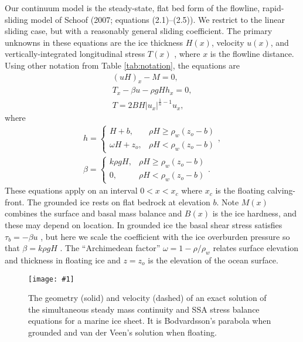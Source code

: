 \documentclass[twocolumn,letterpaper]{igs}
\newcommand{\onecol}[1]{\texttt{[image: \#1]}}
\begin{document}
Our continuum model is the steady-state, flat bed form of the flowline, rapid-sliding model of Schoof\nocite{SchoofMarine1} (2007; equations (2.1)--(2.5)).  We restrict to the linear sliding case, but with a reasonably general sliding coefficient.  The primary unknowns in these equations are the ice thickness $H(x)$, velocity $u(x)$, and vertically-integrated longitudinal stress $T(x)$ \citep{SchoofStream}, where $x$ is the flowline distance.  Using other notation from Table \ref{tab:notation}, the equations are
\begin{gather}
(uH)_x - M = 0, \label{eq:steadymass} \\
T_x - \beta u - \rho g H h_x = 0, \label{eq:steadySSA} \\
T = 2 B H |u_x|^{\frac{1}{n}-1} u_x, \label{eq:Tstress}
\end{gather}
where
\begin{gather}
h = \begin{cases} H+b,            & \rho H \ge \rho_w (z_o - b) \\
                  \omega H + z_o, & \rho H < \rho_w (z_o - b) \end{cases}, \label{eq:surface} \\
\beta = \begin{cases} k \rho g H,    & \rho H \ge \rho_w (z_o - b) \\
                      0,          & \rho H < \rho_w (z_o - b) \end{cases}. \label{eq:betafull}
\end{gather}
These equations apply on an interval $0 < x < x_c$ where $x_c$ is the floating calving-front.  The grounded ice rests on flat bedrock at elevation $b$.  Note $M(x)$ combines the surface and basal mass balance and $B(x)$ is the ice hardness, and these may depend on location.  In grounded ice the basal shear stress satisfies $\tau_b = - \beta u$ \citep{MacAyeal}, but here we scale the coefficient with the ice overburden pressure so that $\beta = k \rho g H$ \citep{Bodvardsson}.  The ``Archimedean factor'' $\omega = 1 - \rho/\rho_w$ relates surface elevation and thickness in floating ice and $z=z_o$ is the elevation of the ocean surface.

\begin{figure}[ht]
\onecol{exactmarine-geometry}
\caption{The geometry (solid) and velocity (dashed) of an exact solution of the simultaneous steady mass continuity and SSA stress balance equations for a marine ice sheet.  It is Bodvardsson's parabola when grounded and van der Veen's solution when floating.} \label{fig:exactmarine}
\end{figure}
\end{document}
